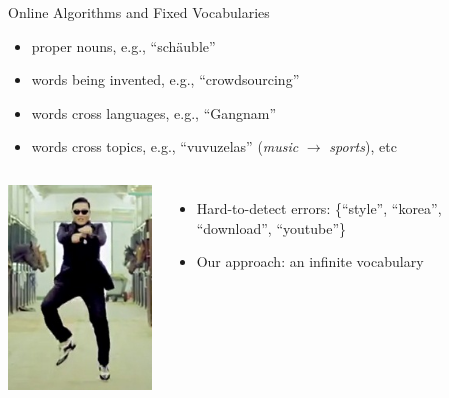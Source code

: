 \documentclass[xcolor=dvipsnames]{beamer}
\begin{document}
\begin{frame}{Online Algorithms and Fixed Vocabularies}

\begin{block}{}
\begin{itemize}
\item proper nouns, e.g., ``sch\"{a}uble''
\item words being invented, e.g., ``crowdsourcing''
\item words cross languages, e.g., ``Gangnam''
\item words cross topics, e.g., ``vuvuzelas'' (\textit{music}
  $\rightarrow$ \textit{sports}), etc
\end{itemize}
\end{block}
\pause
\begin{columns}


\centering
\includegraphics[width=.5\linewidth]{infvoc/psy}



\begin{itemize}
  \item Hard-to-detect errors: \{``style'', ``korea'',
    ``download'', ``youtube''\}
\pause
      \item Our approach: an infinite vocabulary
\end{itemize}


\end{columns}

\end{frame}

\end{document}
